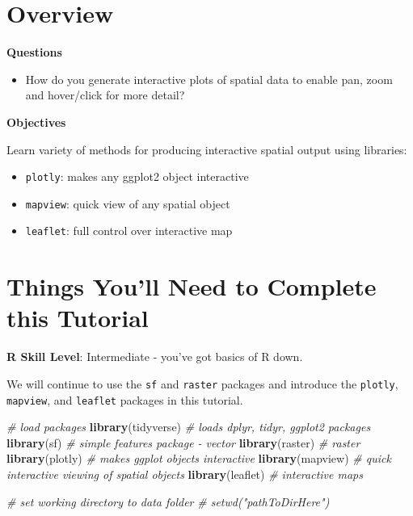 \documentclass[]{book}
\newenvironment{Shaded}{\begin{snugshade}}{\end{snugshade}}
\newcommand{\KeywordTok}[1]{\textcolor[rgb]{0.13,0.29,0.53}{\textbf{{#1}}}}
\newcommand{\CommentTok}[1]{\textcolor[rgb]{0.56,0.35,0.01}{\textit{{#1}}}}
\newcommand{\NormalTok}[1]{{#1}}
\providecommand{\tightlist}{%
  \setlength{\itemsep}{0pt}\setlength{\parskip}{0pt}}
\theoremstyle{definition}
\theoremstyle{definition}
\theoremstyle{definition}
\theoremstyle{remark}
\begin{document}
\section{Overview}\label{overview-1}

\textbf{Questions}

\begin{itemize}
\tightlist
\item
  How do you generate interactive plots of spatial data to enable pan,
  zoom and hover/click for more detail?
\end{itemize}

\textbf{Objectives}

Learn variety of methods for producing interactive spatial output using
libraries:

\begin{itemize}
\tightlist
\item
  \texttt{plotly}: makes any ggplot2 object interactive
\item
  \texttt{mapview}: quick view of any spatial object
\item
  \texttt{leaflet}: full control over interactive map
\end{itemize}

\section{Things You'll Need to Complete this
Tutorial}\label{things-youll-need-to-complete-this-tutorial}

\textbf{R Skill Level}: Intermediate - you've got basics of R down.

We will continue to use the \texttt{sf} and \texttt{raster} packages and
introduce the \texttt{plotly}, \texttt{mapview}, and \texttt{leaflet}
packages in this tutorial.

\begin{Shaded}
\begin{Highlighting}[]
\CommentTok{# load packages}
\KeywordTok{library}\NormalTok{(tidyverse)  }\CommentTok{# loads dplyr, tidyr, ggplot2 packages}
\KeywordTok{library}\NormalTok{(sf)         }\CommentTok{# simple features package - vector}
\KeywordTok{library}\NormalTok{(raster)     }\CommentTok{# raster}
\KeywordTok{library}\NormalTok{(plotly)     }\CommentTok{# makes ggplot objects interactive}
\KeywordTok{library}\NormalTok{(mapview)    }\CommentTok{# quick interactive viewing of spatial objects}
\KeywordTok{library}\NormalTok{(leaflet)    }\CommentTok{# interactive maps}

\CommentTok{# set working directory to data folder}
\CommentTok{# setwd("pathToDirHere")}
\end{Highlighting}
\end{Shaded}
\end{document}
